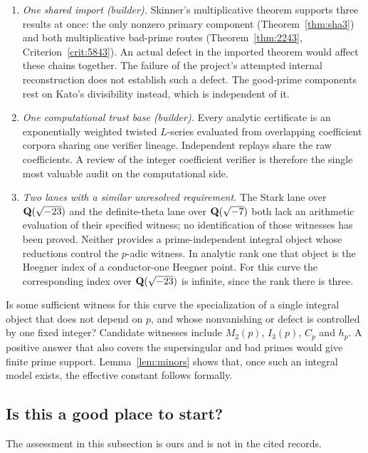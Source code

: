 \begin{enumerate}[label=(\alph*),leftmargin=*]
\item \emph{One shared import (builder).} Skinner's multiplicative theorem supports three results at once: the only nonzero primary component (Theorem~\ref{thm:sha3}) and both multiplicative bad-prime routes (Theorem~\ref{thm:2243}, Criterion~\ref{crit:5843}). An actual defect in the imported theorem would affect these chains together. The failure of the project's attempted internal reconstruction does not establish such a defect. The good-prime components rest on Kato's divisibility instead, which is independent of it.

\item \emph{One computational trust base (builder).} Every analytic certificate is an exponentially weighted twisted $L$-series evaluated from overlapping coefficient corpora sharing one verifier lineage. Independent replays share the raw coefficients. A review of the integer coefficient verifier is therefore the single most valuable audit on the computational side.

\item \emph{Two lanes with a similar unresolved requirement.} The Stark lane over $\mathbf{Q}(\sqrt{-23})$ and the definite-theta lane over $\mathbf{Q}(\sqrt{-7})$ both lack an arithmetic evaluation of their specified witness; no identification of those witnesses has been proved. Neither provides a prime-independent integral object whose reductions control the $p$-adic witness. In analytic rank one that object is the Heegner index of a conductor-one Heegner point. For this curve the corresponding index over $\mathbf{Q}(\sqrt{-23})$ is infinite, since the rank there is three.
\end{enumerate}

\begin{question}[\cid{O.4}]\label{q:uniform}
Is some sufficient witness for this curve the specialization of a single integral object that does not depend on $p$, and whose nonvanishing or defect is controlled by one fixed integer? Candidate witnesses include $M_2(p)$, $I_3(p)$, $C_p$ and $h_p$. A positive answer that also covers the supersingular and bad primes would give finite prime support. Lemma~\ref{lem:minors} shows that, once such an integral model exists, the effective constant follows formally.
\end{question}

\subsection{Is this a good place to start?}
The assessment in this subsection is ours and is not in the cited records.

